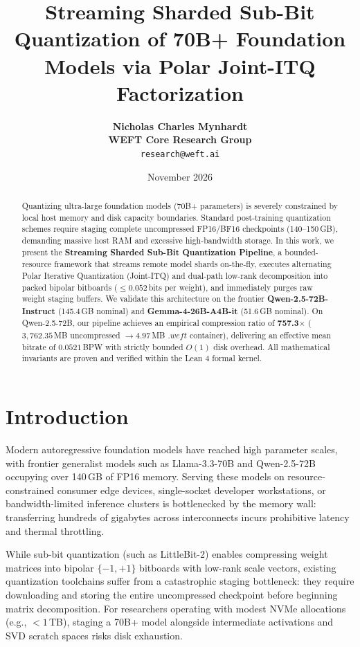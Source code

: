\documentclass[11pt,a4paper]{article}
\title{\textbf{Streaming Sharded Sub-Bit Quantization of 70B+ Foundation Models via Polar Joint-ITQ Factorization}}
\author{
  \textbf{Nicholas Charles Mynhardt} \\
  \textbf{WEFT Core Research Group} \\
\texttt{research@weft.ai}
}
\date{November 2026}
\begin{document}
\maketitle

\begin{abstract}
Quantizing ultra-large foundation models (70B+ parameters) is severely constrained by local host memory and disk capacity boundaries. Standard post-training quantization schemes require staging complete uncompressed FP16/BF16 checkpoints (140--150\,GB), demanding massive host RAM and excessive high-bandwidth storage. In this work, we present the \textbf{Streaming Sharded Sub-Bit Quantization Pipeline}, a bounded-resource framework that streams remote model shards on-the-fly, executes alternating Polar Iterative Quantization (Joint-ITQ) and dual-path low-rank decomposition into packed bipolar bitboards ($\le 0.052$\,bits per weight), and immediately purges raw weight staging buffers. We validate this architecture on the frontier \textbf{Qwen-2.5-72B-Instruct} (145.4\,GB nominal) and \textbf{Gemma-4-26B-A4B-it} (51.6\,GB nominal). On Qwen-2.5-72B, our pipeline achieves an empirical compression ratio of \textbf{757.3$\times$} ($3,762.35$\,MB uncompressed $\to 4.97$\,MB $.weft$ container), delivering an effective mean bitrate of $0.0521$\,BPW with strictly bounded $O(1)$ disk overhead. All mathematical invariants are proven and verified within the Lean 4 formal kernel.
\end{abstract}

\section{Introduction}
Modern autoregressive foundation models have reached high parameter scales, with frontier generalist models such as Llama-3.3-70B and Qwen-2.5-72B occupying over 140\,GB of FP16 memory. Serving these models on resource-constrained consumer edge devices, single-socket developer workstations, or bandwidth-limited inference clusters is bottlenecked by the memory wall: transferring hundreds of gigabytes across interconnects incurs prohibitive latency and thermal throttling.

While sub-bit quantization (such as LittleBit-2) enables compressing weight matrices into bipolar $\{-1, +1\}$ bitboards with low-rank scale vectors, existing quantization toolchains suffer from a catastrophic staging bottleneck: they require downloading and storing the entire uncompressed checkpoint before beginning matrix decomposition. For researchers operating with modest NVMe allocations (e.g., $< 1$\,TB), staging a 70B+ model alongside intermediate activations and SVD scratch spaces risks disk exhaustion.
\end{document}
